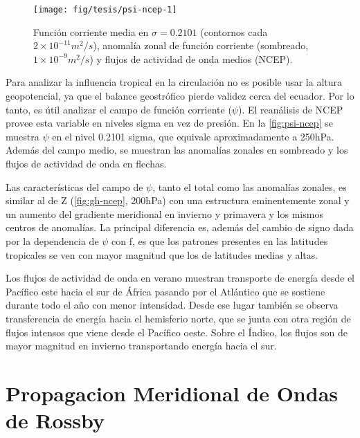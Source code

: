\documentclass[spanish,a4paper,12pt,oneside]{book}
\begin{document}
\begin{landscape}\begin{figure}

{\centering \texttt{[image: fig/tesis/psi-ncep-1]} 

}

\caption{Función corriente media en $\sigma = 0.2101$ (contornos cada $2\times10^{-11}m^2/s$), anomalía zonal de función corriente (sombreado,  $1\times10^{-9}m^2/s$) y flujos de actividad de onda medios (NCEP).}\label{fig:psi-ncep}
\end{figure}
\end{landscape}

Para analizar la influencia tropical en la circulación no es posible
usar la altura geopotencial, ya que el balance geostrófico pierde
validez cerca del ecuador. Por lo tanto, es útil analizar el campo de
función corriente (\(\psi\)). El reanálisis de NCEP provee esta variable
en niveles sigma en vez de presión. En la \autoref{fig:psi-ncep} se
muestra \(\psi\) en el nivel 0.2101 sigma, que equivale aproximadamente
a 250hPa. Además del campo medio, se muestran las anomalías zonales en
sombreado y los flujos de actividad de onda en flechas.

Las características del campo de \(\psi\), tanto el total como las
anomalías zonales, es similar al de Z (\autoref{fig:gh-ncep}, 200hPa)
con una estructura eminentemente zonal y un aumento del gradiente
meridional en invierno y primavera y los mismos centros de anomalías. La
principal diferencia es, además del cambio de signo dada por la
dependencia de \(\psi\) con f, es que los patrones presentes en las
latitudes tropicales se ven con mayor magnitud que los de latitudes
medias y altas.

Los flujos de actividad de onda en verano muestran transporte de energía
desde el Pacífico este hacia el sur de África pasando por el Atlántico
que se sostiene durante todo el año con menor intensidad. Desde ese
lugar también se observa transferencia de energía hacia el hemisferio
norte, que se junta con otra región de flujos intensos que viene desde
el Pacífico oeste. Sobre el Índico, los flujos son de mayor magnitud en
invierno transportando energía hacia el sur.

\section{Propagacion Meridional de Ondas de
Rossby}\label{propagacion-meridional-de-ondas-de-rossby}
\end{document}
